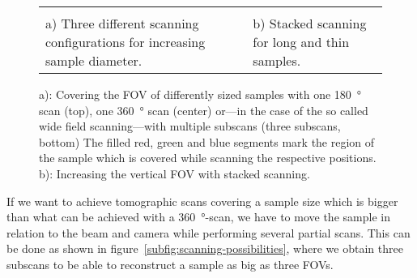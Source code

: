 \begin{figure}
	\centering
	\caption{a): Covering the FOV of differently sized samples with one \SI{180}{\degree} scan (top), one \SI{360}{\degree} scan (center) or---in the case of the so called wide field scanning---with multiple subscans (three subscans, bottom) The filled red, green and blue segments mark the region of the sample which is covered while scanning the respective positions. b): Increasing the vertical FOV with stacked scanning.}%
	\begin{tabular}{p{.4\linewidth}p{.4\linewidth}}%
		\label{subfig:scanning-possibilities}%
	&
		\label{subfig:stacked-scan}%
	\\
		a) Three different scanning configurations for increasing sample diameter.%
	&
		b) Stacked scanning for long and thin samples.%
	\\
	\end{tabular}%
	\label{fig:scanning-possibilities}%
\end{figure}

If we want to achieve tomographic scans covering a sample size which is bigger than what can be achieved with a \SI{360}{\degree}-scan, we have to move the sample in relation to the beam and camera while performing several partial scans. This can be done as shown in figure~\ref{subfig:scanning-possibilities}, where we obtain three subscans to be able to reconstruct a sample as big as three FOVs.

